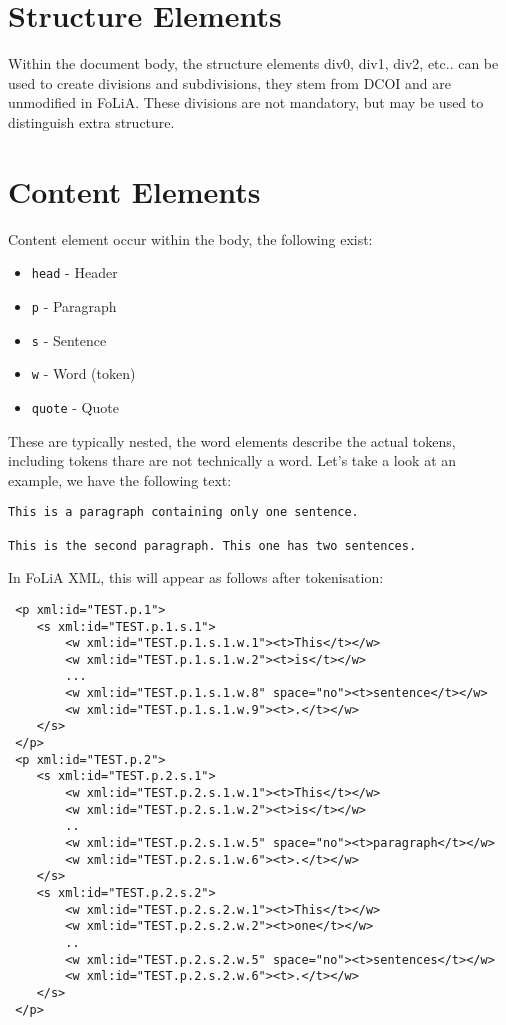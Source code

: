 \documentclass[a4paper,12pt]{article}
\begin{document}
\section{Structure Elements}

Within the document body, the structure elements div0, div1, div2, etc.. can be used to create divisions and subdivisions, they stem from DCOI and are unmodified in FoLiA. These divisions are not mandatory, but may be used to distinguish extra structure.

\section{Content Elements}

Content element occur within the body, the following exist:

\begin{itemize}
\item \texttt{head} - Header
\item \texttt{p} - Paragraph
\item \texttt{s} - Sentence
\item \texttt{w} - Word (token)
\item \texttt{quote} - Quote
\end{itemize}

These are typically nested, the word elements describe the actual tokens, including tokens thare are not technically a word. Let's take a look at an example, we have the following text:


\begin{verbatim}
This is a paragraph containing only one sentence.

This is the second paragraph. This one has two sentences.
\end{verbatim}

In FoLiA XML, this will appear as follows after tokenisation:


\begin{verbatim}
 <p xml:id="TEST.p.1">
    <s xml:id="TEST.p.1.s.1">        
        <w xml:id="TEST.p.1.s.1.w.1"><t>This</t></w>
        <w xml:id="TEST.p.1.s.1.w.2"><t>is</t></w>
        ...
        <w xml:id="TEST.p.1.s.1.w.8" space="no"><t>sentence</t></w>
        <w xml:id="TEST.p.1.s.1.w.9"><t>.</t></w>
    </s>
 </p>
 <p xml:id="TEST.p.2">
    <s xml:id="TEST.p.2.s.1">
        <w xml:id="TEST.p.2.s.1.w.1"><t>This</t></w>
        <w xml:id="TEST.p.2.s.1.w.2"><t>is</t></w>    
        ..
        <w xml:id="TEST.p.2.s.1.w.5" space="no"><t>paragraph</t></w>    
        <w xml:id="TEST.p.2.s.1.w.6"><t>.</t></w>    
    </s>
    <s xml:id="TEST.p.2.s.2">
        <w xml:id="TEST.p.2.s.2.w.1"><t>This</t></w>
        <w xml:id="TEST.p.2.s.2.w.2"><t>one</t></w>    
        ..
        <w xml:id="TEST.p.2.s.2.w.5" space="no"><t>sentences</t></w>    
        <w xml:id="TEST.p.2.s.2.w.6"><t>.</t></w>    
    </s>
 </p>
\end{verbatim}
\end{document}
